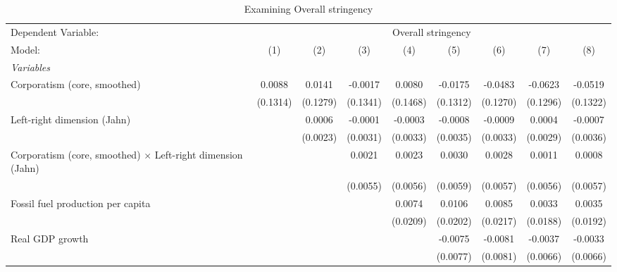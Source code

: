 
\begin{table}[htbp]
   \caption{Examining Overall stringency}
   \centering
   \begin{tabular}{lcccccccc}
      \tabularnewline \midrule \midrule
      Dependent Variable: & \multicolumn{8}{c}{Overall stringency}\\
      Model:                                                             & (1)                   & (2)      & (3)      & (4)      & (5)      & (6)      & (7)      & (8)\\  
      \midrule
      \emph{Variables}\\
      Corporatism (core, smoothed)                                       & 0.0088                & 0.0141   & -0.0017  & 0.0080   & -0.0175  & -0.0483  & -0.0623  & -0.0519\\   
                                                                         & (0.1314)              & (0.1279) & (0.1341) & (0.1468) & (0.1312) & (0.1270) & (0.1296) & (0.1322)\\   
      Left-right dimension (Jahn)                                        &                       & 0.0006   & -0.0001  & -0.0003  & -0.0008  & -0.0009  & 0.0004   & -0.0007\\   
                                                                         &                       & (0.0023) & (0.0031) & (0.0033) & (0.0035) & (0.0033) & (0.0029) & (0.0036)\\   
      Corporatism (core, smoothed) $\times$ Left-right dimension (Jahn)  &                       &          & 0.0021   & 0.0023   & 0.0030   & 0.0028   & 0.0011   & 0.0008\\   
                                                                         &                       &          & (0.0055) & (0.0056) & (0.0059) & (0.0057) & (0.0056) & (0.0057)\\   
      Fossil fuel production per capita                                  &                       &          &          & 0.0074   & 0.0106   & 0.0085   & 0.0033   & 0.0035\\   
                                                                         &                       &          &          & (0.0209) & (0.0202) & (0.0217) & (0.0188) & (0.0192)\\   
      Real GDP growth                                                    &                       &          &          &          & -0.0075  & -0.0081  & -0.0037  & -0.0033\\   
                                                                         &                       &          &          &          & (0.0077) & (0.0081) & (0.0066) & (0.0066)\\   

\end{tabular}
\end{table}
